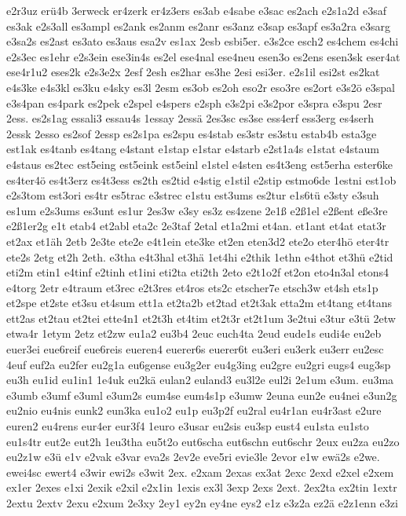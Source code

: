 {e2r3uz
erü4b
3erweck
er4zerk
er4z3ers
es3ab
e4sabe
e3sac
es2ach
e2s1a2d
e3saf
es3ak
e2s3all
es3ampl
es2ank
es2anm
es2anr
es3anz
e3sap
es3apf
es3a2ra
e3sarg
e3sa2s
es2ast
es3ato
es3aus
esa2v
es1ax
2esb
esbi5er.
e3s2ce
esch2
es4chem
es4chi
e2s3ec
es1ehr
e2s3ein
ese3in4s
es2el
ese4nal
ese4neu
esen3o
es2ens
esen3sk
eser4at
ese4r1u2
eses2k
e2s3e2x
2esf
2esh
es2har
es3he
2esi
esi3er.
e2s1il
esi2st
es2kat
e4s3ke
e4s3kl
es3ku
e4sky
es3l
2esm
es3ob
es2oh
eso2r
eso3re
es2ort
e3s2ö
e3spal
e3s4pan
es4park
es2pek
e2spel
e4spers
e2sph
e3s2pi
e3s2por
e3spra
e3spu
2esr
2ess.
es2s1ag
essali3
essau4s
1essay
2essä
2es3sc
es3se
ess4erf
ess3erg
es4serh
2essk
2esso
es2sof
2essp
es2s1pa
es2spu
es4stab
es3str
es3stu
estab4b
esta3ge
est1ak
es4tanb
es4tang
e4stant
e1stap
e1star
e4starb
e2st1a4s
e1stat
e4staum
e4staus
es2tec
est5eing
est5eink
est5einl
e1stel
e4sten
es4t3eng
est5erha
ester6ke
es4ter4ö
es4t3erz
es4t3ess
es2th
es2tid
e4stig
e1stil
e2stip
estmo6de
1estni
est1ob
e2s3tom
est3ori
es4tr
es5trac
e3strec
e1stu
est3ums
es2tur
e1s6tü
e3sty
e3suh
es1um
e2s3ums
es3unt
es1ur
2es3w
e3sy
es3z
es4zene
2e1ß
e2ß1el
e2ßent
eße3re
e2ß1er2g
e1t
etab4
et2abl
eta2c
2e3taf
2etal
et1a2mi
et4an.
et1ant
et4at
etat3r
et2ax
et1äh
2etb
2e3te
ete2e
e4t1ein
ete3ke
et2en
eten3d2
ete2o
eter4hö
eter4tr
ete2s
2etg
et2h
2eth.
e3tha
e4t3hal
et3hä
1et4hi
e2thik
1ethn
e4thot
et3hü
e2tid
eti2m
etin1
e4tinf
e2tinh
et1ini
eti2ta
eti2th
2eto
e2t1o2f
et2on
eto4n3al
etons4
e4torg
2etr
e4traum
et3rec
e2t3res
et4ros
ets2c
etscher7e
etsch3w
et4sh
ets1p
et2spe
et2ste
et3su
et4sum
ett1a
et2ta2b
et2tad
et2t3ak
etta2m
et4tang
et4tans
ett2as
et2tau
et2tei
ette4n1
et2t3h
et4tim
et2t3r
et2t1um
3e2tui
e3tur
e3tü
2etw
etwa4r
1etym
2etz
et2zw
eu1a2
eu3b4
2euc
euch4ta
2eud
eude1s
eudi4e
eu2eb
euer3ei
eue6reif
eue6reis
eueren4
euerer6s
euerer6t
eu3eri
eu3erk
eu3err
eu2esc
4euf
euf2a
eu2fer
eu2g1a
eu6gense
eu3g2er
eu4g3ing
eu2gre
eu2gri
eugs4
eug3sp
eu3h
eu1id
eu1in1
1e4uk
eu2kä
eulan2
euland3
eu3l2e
eul2i
2e1um
e3um.
eu3ma
e3umb
e3umf
e3uml
e3um2s
eum4se
eum4s1p
e3umw
2euna
eun2e
eu4nei
e3un2g
eu2nio
eu4nis
eunk2
eun3ka
eu1o2
eu1p
eu3p2f
eu2ral
eu4r1an
eu4r3ast
e2ure
euren2
eu4rens
eur4er
eur3f4
1euro
e3usar
eu2sis
eu3sp
eust4
eu1sta
eu1sto
eu1s4tr
eut2e
eut2h
1eu3tha
eu5t2o
eut6scha
eut6schn
eut6schr
2eux
eu2za
eu2zo
eu2z1w
e3ü
e1v
e2vak
e3var
eva2s
2ev2e
eve5ri
evie3le
2evor
e1w
ewä2s
e2we.
ewei4sc
ewert4
e3wir
ewi2s
e3wit
2ex.
e2xam
2exas
ex3at
2exc
2exd
e2xel
e2xem
ex1er
2exes
e1xi
2exik
e2xil
e2x1in
1exis
ex3l
3exp
2exs
2ext.
2ex2ta
ex2tin
1extr
2extu
2extv
2exu
e2xum
2e3xy
2ey1
ey2n
ey4ne
eys2
e1z
e3z2a
ez2ä
e2z1enn
e3zi
}
